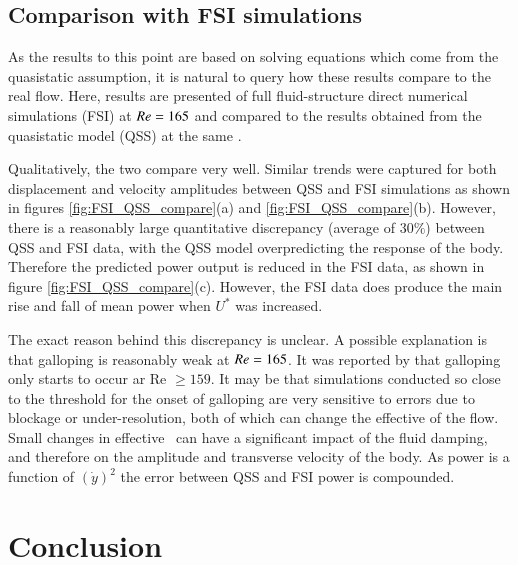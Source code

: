 



\subsection{Comparison with FSI simulations}
As the results to this point are based on solving equations which come from the quasistatic assumption, it is natural to query how these results compare to the real flow. Here, results are presented of full fluid-structure direct numerical simulations (FSI) at $Re=165$ and compared to the results obtained from the quasistatic model (QSS) at the same \reynoldsnumber.

Qualitatively, the two compare very well. Similar trends were captured for both displacement and velocity amplitudes between QSS and FSI simulations as shown in figures \ref{fig:FSI_QSS_compare}(a) and \ref{fig:FSI_QSS_compare}(b). However, there is a reasonably large quantitative discrepancy (average of $30\%$) between QSS and FSI data, with the QSS model overpredicting the response of the body. Therefore the predicted power output is reduced in the FSI data, as shown in figure \ref{fig:FSI_QSS_compare}(c). However, the FSI data does produce the main rise and fall of mean power when $U^*$ was increased.

The exact reason behind this discrepancy is unclear. A possible explanation is that galloping is reasonably weak at $Re=165$.  It was reported by \cite{Barrero-Gil2009} that galloping only starts to occur ar Re $\geq 159$. It may be that simulations conducted so close to the threshold for the onset of galloping are very sensitive to errors due to blockage or under-resolution, both of which can change the effective \reynoldsnumber of the flow. Small changes in effective \reynoldsnumber\ can have a significant impact of the fluid damping, and therefore on the amplitude and transverse velocity of the body. As power is a function of $(\dot{y})^2$ the error between QSS and FSI power is compounded.

\section{Conclusion}
\label{sec:conc}

